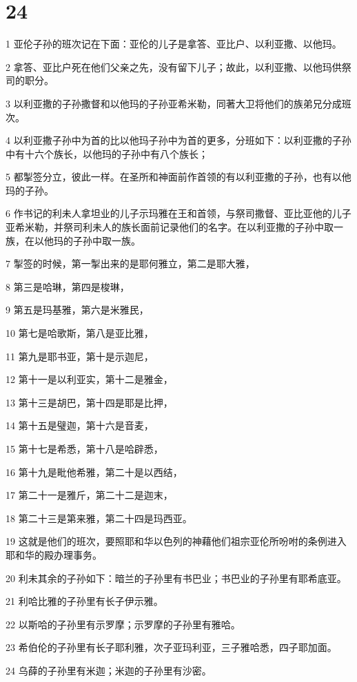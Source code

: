\chapter{24}

\par 1 亚伦子孙的班次记在下面：亚伦的儿子是拿答、亚比户、以利亚撒、以他玛。
\par 2 拿答、亚比户死在他们父亲之先，没有留下儿子；故此，以利亚撒、以他玛供祭司的职分。
\par 3 以利亚撒的子孙撒督和以他玛的子孙亚希米勒，同著大卫将他们的族弟兄分成班次。
\par 4 以利亚撒子孙中为首的比以他玛子孙中为首的更多，分班如下：以利亚撒的子孙中有十六个族长，以他玛的子孙中有八个族长；
\par 5 都掣签分立，彼此一样。在圣所和神面前作首领的有以利亚撒的子孙，也有以他玛的子孙。
\par 6 作书记的利未人拿坦业的儿子示玛雅在王和首领，与祭司撒督、亚比亚他的儿子亚希米勒，并祭司利未人的族长面前记录他们的名字。在以利亚撒的子孙中取一族，在以他玛的子孙中取一族。
\par 7 掣签的时候，第一掣出来的是耶何雅立，第二是耶大雅，
\par 8 第三是哈琳，第四是梭琳，
\par 9 第五是玛基雅，第六是米雅民，
\par 10 第七是哈歌斯，第八是亚比雅，
\par 11 第九是耶书亚，第十是示迦尼，
\par 12 第十一是以利亚实，第十二是雅金，
\par 13 第十三是胡巴，第十四是耶是比押，
\par 14 第十五是璧迦，第十六是音麦，
\par 15 第十七是希悉，第十八是哈辟悉，
\par 16 第十九是毗他希雅，第二十是以西结，
\par 17 第二十一是雅斤，第二十二是迦末，
\par 18 第二十三是第来雅，第二十四是玛西亚。
\par 19 这就是他们的班次，要照耶和华以色列的神藉他们祖宗亚伦所吩咐的条例进入耶和华的殿办理事务。
\par 20 利未其余的子孙如下：暗兰的子孙里有书巴业；书巴业的子孙里有耶希底亚。
\par 21 利哈比雅的子孙里有长子伊示雅。
\par 22 以斯哈的子孙里有示罗摩；示罗摩的子孙里有雅哈。
\par 23 希伯伦的子孙里有长子耶利雅，次子亚玛利亚，三子雅哈悉，四子耶加面。
\par 24 乌薛的子孙里有米迦；米迦的子孙里有沙密。

